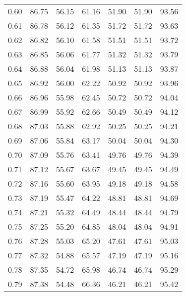 \begin{tabular}{|c|c|c|c|c|c|c|}
      0.60 &     86.75 &     56.15 &      61.16 &   51.90 &      51.90 &         93.56 \\
      0.61 &     86.78 &     56.12 &      61.35 &   51.72 &      51.72 &         93.63 \\
      0.62 &     86.82 &     56.10 &      61.58 &   51.51 &      51.51 &         93.72 \\
      0.63 &     86.85 &     56.06 &      61.77 &   51.32 &      51.32 &         93.79 \\
      0.64 &     86.88 &     56.04 &      61.98 &   51.13 &      51.13 &         93.87 \\
      0.65 &     86.92 &     56.00 &      62.22 &   50.92 &      50.92 &         93.96 \\
      0.66 &     86.96 &     55.98 &      62.45 &   50.72 &      50.72 &         94.04 \\
      0.67 &     86.99 &     55.92 &      62.66 &   50.49 &      50.49 &         94.12 \\
      0.68 &     87.03 &     55.88 &      62.92 &   50.25 &      50.25 &         94.21 \\
      0.69 &     87.06 &     55.84 &      63.17 &   50.04 &      50.04 &         94.30 \\
      0.70 &     87.09 &     55.76 &      63.41 &   49.76 &      49.76 &         94.39 \\
      0.71 &     87.12 &     55.67 &      63.67 &   49.45 &      49.45 &         94.49 \\
      0.72 &     87.16 &     55.60 &      63.95 &   49.18 &      49.18 &         94.58 \\
      0.73 &     87.19 &     55.47 &      64.22 &   48.81 &      48.81 &         94.69 \\
      0.74 &     87.21 &     55.32 &      64.49 &   48.44 &      48.44 &         94.79 \\
      0.75 &     87.25 &     55.20 &      64.85 &   48.04 &      48.04 &         94.91 \\
      0.76 &     87.28 &     55.03 &      65.20 &   47.61 &      47.61 &         95.03 \\
      0.77 &     87.32 &     54.88 &      65.57 &   47.19 &      47.19 &         95.16 \\
      0.78 &     87.35 &     54.72 &      65.98 &   46.74 &      46.74 &         95.29 \\
      0.79 &     87.38 &     54.48 &      66.36 &   46.21 &      46.21 &         95.42 \\

\end{tabular}
